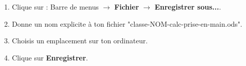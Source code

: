 \begin{enumerate}
    \item Clique sur : Barre de menus $\rightarrow$ \textbf{Fichier} $\rightarrow$  \textbf{Enregistrer sous...}.
    \item Donne un nom explicite à ton fichier "classe-NOM-calc-prise-en-main.ods".
    \item Choisis un emplacement sur ton ordinateur.
    \item Clique sur \textbf{Enregistrer}.
\end{enumerate}



